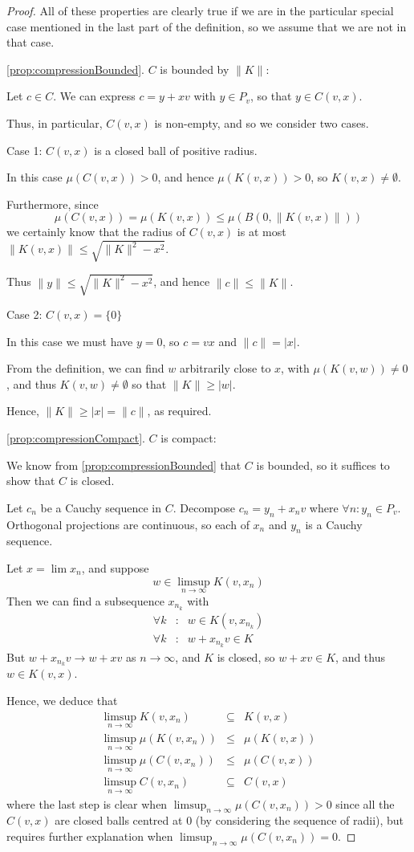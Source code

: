 \documentclass[a4paper,11pt]{article}
\newcommand{\lv}{\lvert}
\newcommand{\rv}{\rvert}
\newcommand{\lV}{\lVert}
\newcommand{\rV}{\rVert}
\begin{document}
\begin{proof}
All of these properties are clearly true if we are in the particular special
case mentioned in the last part of the definition, so we assume that we are not
in that case.

\ref{prop:compressionBounded}. $C$ is bounded by $\lV K\rV$:

Let $c\in C$.  We can express $c=y+xv$ with $y\in P_v$, so that $y\in C(v,x)$.

Thus, in particular, $C(v,x)$ is non-empty, and so we consider two cases.

Case 1: $C(v,x)$ is a closed ball of positive radius.

In this case
$\mu(C(v,x))>0$, and hence $\mu(K(v,x))>0$, so $K(v,x)\not=\emptyset$.

Furthermore, since
\[
\mu(C(v,x))=\mu(K(v,x))\leq\mu(B(0,\lV K(v,x)\rV))
\]
we certainly know that the radius
of $C(v,x)$ is at most $\lV K(v,x)\rV\leq\sqrt{\lV K\rV^2-x^2}$.

Thus $\lV y\rV\leq\sqrt{\lV K\rV^2-x^2}$, and hence $\lV c\rV\leq\lV K\rV$.

Case 2: $C(v,x)=\{0\}$

In this case we must have $y=0$, so $c=vx$ and $\lV c\rV=\lv x\rv$.

From the definition, we can find $w$
arbitrarily close to $x$, with $\mu(K(v,w))\not=0$, and thus
$K(v,w)\not=\emptyset$ so that $\lV K\rV\geq\lv w\rv$.

Hence, $\lV K\rV\geq\lv x\rv=\lV c\rV$, as required.

\ref{prop:compressionCompact}. $C$ is compact:

We know from \ref{prop:compressionBounded} that $C$ is bounded, so it suffices
to show that $C$ is closed.

Let $c_n$ be a Cauchy sequence in $C$.  Decompose $c_n=y_n+x_nv$ where
$\forall n:y_n\in P_v$.  Orthogonal projections are continuous, so each of
$x_n$ and $y_n$ is a Cauchy sequence.

Let $x=\lim x_n$, and suppose
\[
w\in\limsup_{n\to\infty}K(v,x_n)
\]
Then we can find a subsequence $x_{n_k}$ with
%
\begin{eqnarray*}
\forall k&:&w\in K(v,x_{n_k}) \\
\forall k&:&w+x_{n_k}v\in K
\end{eqnarray*}
%
But $w+x_{n_k}v\to w+xv$ as $n\to\infty$, and $K$ is closed, so $w+xv\in K$,
and thus $w\in K(v,x)$.

Hence, we deduce that
%
\begin{eqnarray*}
\limsup_{n\to\infty} K(v,x_n) &\subseteq& K(v,x) \\
\limsup_{n\to\infty}\mu(K(v,x_n)) &\leq& \mu(K(v,x)) \\
\limsup_{n\to\infty}\mu(C(v,x_n)) &\leq& \mu(C(v,x)) \\
\limsup_{n\to\infty}C(v,x_n) &\subseteq& C(v,x)
\end{eqnarray*}
%
where the last step is clear when $\limsup_{n\to\infty}\mu(C(v,x_n))>0$
since all the $C(v,x)$ are closed balls centred at $0$ (by considering the
sequence of radii),
but requires further explanation when $\limsup_{n\to\infty}\mu(C(v,x_n))=0$.


\end{proof}
\end{document}
